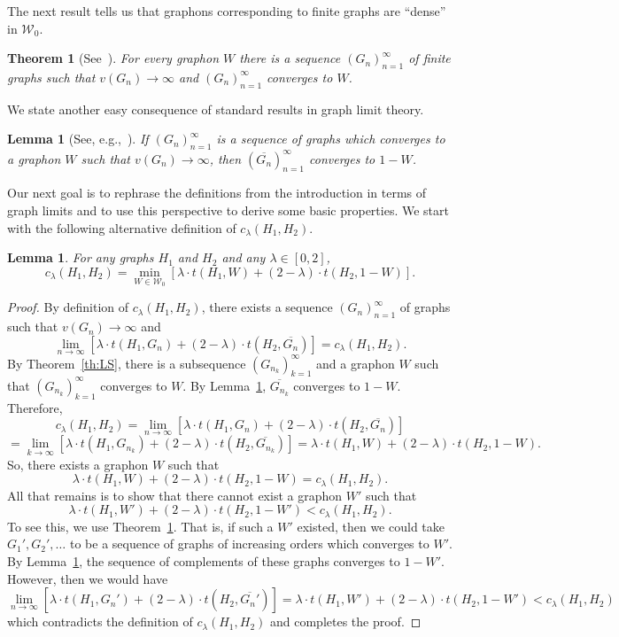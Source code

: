 \documentclass[12pt]{article}
\numberwithin{equation}{section}
\newtheorem{thm}[equation]{Theorem}
\newtheorem{lem}[equation]{Lemma}
\theoremstyle{definition}
\theoremstyle{remark}
\begin{document}
The next result tells us that graphons corresponding to finite graphs are ``dense'' in $\mathcal{W}_0$. 


\begin{thm}[See~{\cite[Chapter~10]{Lovasz12}}]
\label{th:LSconverse}
For every graphon $W$ there is a sequence $(G_n)_{n=1}^\infty$ of finite graphs such that $v(G_n)\to\infty$ and $(G_n)_{n=1}^\infty$ converges to $W$.
\end{thm}

We state another easy consequence of standard results in graph limit theory.

\begin{lem}[See, e.g.,~{\cite[Lemma~10.23]{Lovasz12}}]
\label{lem:complement}
If $(G_n)_{n=1}^\infty$ is a sequence of graphs which converges to a graphon $W$ such that $v(G_n)\to\infty$, then $(\overline{G_n})_{n=1}^\infty$ converges to $1-W$.
\end{lem}

Our next goal is to rephrase the definitions from the introduction in terms of graph limits and to use this perspective to derive some basic properties. We start with the following alternative definition of $c_\lambda(H_1,H_2)$. 

\begin{lem}
\label{lem:altDef}
For any graphs $H_1$ and $H_2$ and any $\lambda\in [0,2]$, 
\[c_\lambda(H_1,H_2)=\min_{W\in\mathcal{W}_0}\left[\lambda\cdot t(H_1,W) + (2-\lambda)\cdot t(H_2,1-W)\right].\]
\end{lem}

\begin{proof}
By definition of $c_\lambda(H_1,H_2)$, there exists a sequence $(G_n)_{n=1}^\infty$ of graphs such that $v(G_n)\to\infty$ and 
\[\lim_{n\to\infty} [\lambda\cdot t(H_1,G_n) + (2-\lambda)\cdot t(H_2,\overline{G_n})]=c_\lambda(H_1,H_2).\]
By Theorem~\ref{th:LS}, there is a subsequence $(G_{n_k})_{k=1}^\infty$ and a graphon $W$ such that $(G_{n_k})_{k=1}^\infty$ converges to $W$. By Lemma~\ref{lem:complement}, $\overline{G_{n_k}}$ converges to $1-W$. Therefore, 
\[c_\lambda(H_1,H_2)=\lim_{n\to\infty} [\lambda\cdot t(H_1,G_n) + (2-\lambda)\cdot t(H_2,\overline{G_n})]\]
\[= \lim_{k\to\infty} [\lambda\cdot t(H_1,G_{n_k}) + (2-\lambda)\cdot t(H_2,\overline{G_{n_k}})] = \lambda \cdot t(H_1,W)+(2-\lambda)\cdot t(H_2,1-W).\]
So, there exists a graphon $W$ such that
\[\lambda \cdot t(H_1,W)+(2-\lambda)\cdot t(H_2,1-W)=c_\lambda(H_1,H_2).\]
All that remains is to show that there cannot exist a graphon $W'$ such that
\[\lambda \cdot t(H_1,W')+(2-\lambda)\cdot t(H_2,1-W')<c_\lambda(H_1,H_2).\]
To see this, we use Theorem~\ref{th:LSconverse}. That is, if such a $W'$ existed, then we could take $G_1',G_2',\dots$ to be a sequence of graphs of increasing orders which converges to $W'$. By Lemma~\ref{lem:complement}, the sequence of complements of these graphs converges to $1-W'$. However, then we would have
\[\lim_{n\to\infty} [\lambda\cdot t(H_1,G_n') + (2-\lambda)\cdot t(H_2,\overline{G_n'})] = \lambda \cdot t(H_1,W')+(2-\lambda)\cdot t(H_2,1-W')<c_\lambda(H_1,H_2)\]
which contradicts the definition of $c_\lambda(H_1,H_2)$ and completes the proof.
\end{proof}
\end{document}
